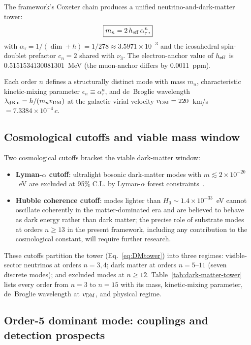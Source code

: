 ﻿\documentclass[reprint,amsmath,amssymb,aps,prd,longbibliography,floatfix]{revtex4-2}
\begin{document}
The framework's Coxeter chain produces a unified neutrino-and-dark-matter
tower:
\begin{equation}
\boxed{m_n = 2 \, h_{\rm eff} \, \alpha_\tau^n,}
\label{eq:DMtower}
\end{equation}
with $\alpha_\tau = 1/(\dim+h) = 1/278 \approx 3.5971 \times 10^{-3}$ and
the icosahedral spin-doublet prefactor $c_n = 2$ shared with $\nu_3$.
The electron-anchor value of $h_{\rm eff}$ is
$0.5151534130081301$~MeV (the muon-anchor differs by 0.0011~ppm).

Each order $n$ defines a structurally distinct mode with mass
$m_n$, characteristic kinetic-mixing parameter
$\epsilon_n \equiv \alpha_\tau^n$, and de~Broglie wavelength
$\lambda_{\rm dB,n} = h/(m_n v_{\rm DM})$ at the galactic virial
velocity $v_{\rm DM} = 220$~km/s $= 7.3384 \times 10^{-4}\,c$.

\subsection{Cosmological cutoffs and viable mass window}

Two cosmological cutoffs bracket the viable dark-matter window:

\begin{itemize}
\item \textbf{Lyman-$\alpha$ cutoff}: ultralight bosonic
dark-matter modes with $m \lesssim 2 \times 10^{-20}$~eV are excluded
at 95\% C.L. by Lyman-$\alpha$ forest constraints~\cite{RogersPeiris2021}.
\item \textbf{Hubble coherence cutoff}: modes lighter than
$H_0 \sim 1.4 \times 10^{-33}$~eV cannot oscillate coherently in the
matter-dominated era and are believed to behave as dark energy rather
than dark matter; the precise role of substrate modes at orders
$n \geq 13$ in the present framework, including any contribution to
the cosmological constant, will require further research.
\end{itemize}

These cutoffs partition the tower (Eq.~\eqref{eq:DMtower}) into three
regimes: visible-sector neutrinos at orders $n = 3, 4$; dark matter at
orders $n = 5$--$11$ (seven discrete modes); and excluded modes at
$n \geq 12$. Table~\ref{tab:dark-matter-tower} lists every order from $n=3$ to
$n=15$ with its mass, kinetic-mixing parameter, de~Broglie wavelength
at $v_{\rm DM}$, and physical regime.



\subsection{Order-5 dominant mode: couplings and detection prospects}
\end{document}
